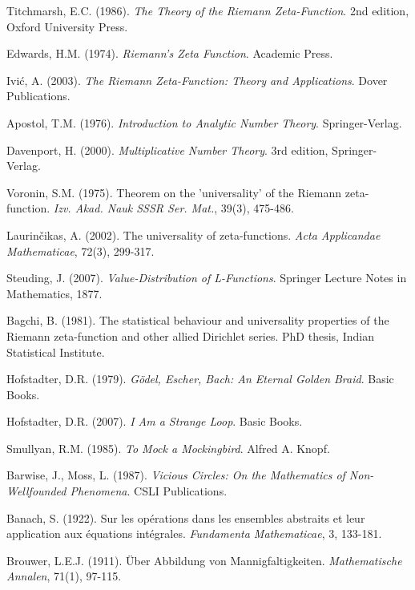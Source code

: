 \documentclass[12pt]{article}
\theoremstyle{plain}
\theoremstyle{definition}
\begin{document}
\begin{thebibliography}{99}
 Titchmarsh, E.C. (1986). \emph{The Theory of the Riemann Zeta-Function}. 2nd edition, Oxford University Press.

 Edwards, H.M. (1974). \emph{Riemann's Zeta Function}. Academic Press.

 Ivić, A. (2003). \emph{The Riemann Zeta-Function: Theory and Applications}. Dover Publications.

 Apostol, T.M. (1976). \emph{Introduction to Analytic Number Theory}. Springer-Verlag.

 Davenport, H. (2000). \emph{Multiplicative Number Theory}. 3rd edition, Springer-Verlag.

 Voronin, S.M. (1975). Theorem on the 'universality' of the Riemann zeta-function. \emph{Izv. Akad. Nauk SSSR Ser. Mat.}, 39(3), 475-486.

 Laurinčikas, A. (2002). The universality of zeta-functions. \emph{Acta Applicandae Mathematicae}, 72(3), 299-317.

 Steuding, J. (2007). \emph{Value-Distribution of L-Functions}. Springer Lecture Notes in Mathematics, 1877.

 Bagchi, B. (1981). The statistical behaviour and universality properties of the Riemann zeta-function and other allied Dirichlet series. PhD thesis, Indian Statistical Institute.

 Hofstadter, D.R. (1979). \emph{Gödel, Escher, Bach: An Eternal Golden Braid}. Basic Books.

 Hofstadter, D.R. (2007). \emph{I Am a Strange Loop}. Basic Books.

 Smullyan, R.M. (1985). \emph{To Mock a Mockingbird}. Alfred A. Knopf.

 Barwise, J., Moss, L. (1987). \emph{Vicious Circles: On the Mathematics of Non-Wellfounded Phenomena}. CSLI Publications.

 Banach, S. (1922). Sur les opérations dans les ensembles abstraits et leur application aux équations intégrales. \emph{Fundamenta Mathematicae}, 3, 133-181.

 Brouwer, L.E.J. (1911). Über Abbildung von Mannigfaltigkeiten. \emph{Mathematische Annalen}, 71(1), 97-115.


\end{thebibliography}
\end{document}
